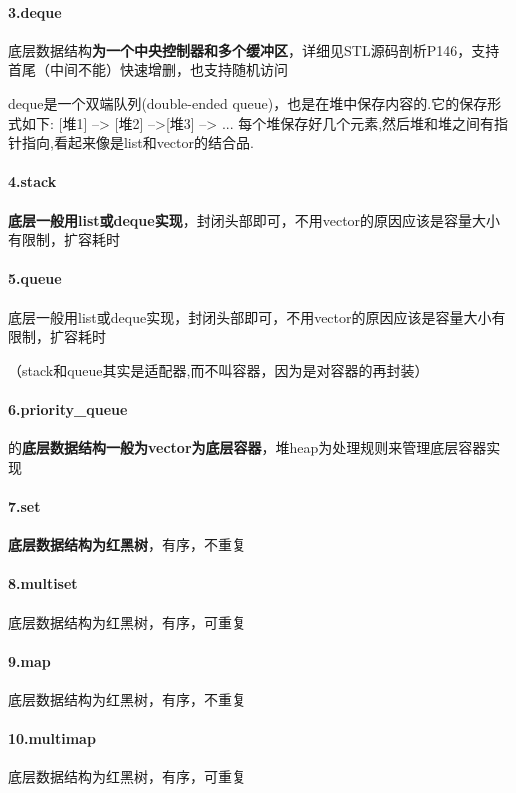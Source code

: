 \documentclass[UTF8,a4paper,12pt]{ctexbook}
\begin{document}
		 \paragraph{3.deque}       底层数据结构\textbf{为一个中央控制器和多个缓冲区}，详细见STL源码剖析P146，支持首尾（中间不能）快速增删，也支持随机访问
		 
		 deque是一个双端队列(double-ended queue)，也是在堆中保存内容的.它的保存形式如下:
		 [堆1] --> [堆2] -->[堆3] --> ...
		 每个堆保存好几个元素,然后堆和堆之间有指针指向,看起来像是list和vector的结合品.
		 
		 
		 \paragraph{4.stack}         \textbf{底层一般用list或deque实现}，封闭头部即可，不用vector的原因应该是容量大小有限制，扩容耗时
		 
		 \paragraph{5.queue}     底层一般用list或deque实现，封闭头部即可，不用vector的原因应该是容量大小有限制，扩容耗时
		 
		 （stack和queue其实是适配器,而不叫容器，因为是对容器的再封装）
		 
		 \paragraph{6.priority\_queue}     的\textbf{底层数据结构一般为vector为底层容器}，堆heap为处理规则来管理底层容器实现
		 
		 \paragraph{7.set }            \textbf{ 底层数据结构为红黑树}，有序，不重复
		 
		 \paragraph{8.multiset}         底层数据结构为红黑树，有序，可重复 
		 
		 \paragraph{9.map }               底层数据结构为红黑树，有序，不重复
		 
		 \paragraph{10.multimap}    底层数据结构为红黑树，有序，可重复
		 
\end{document}

